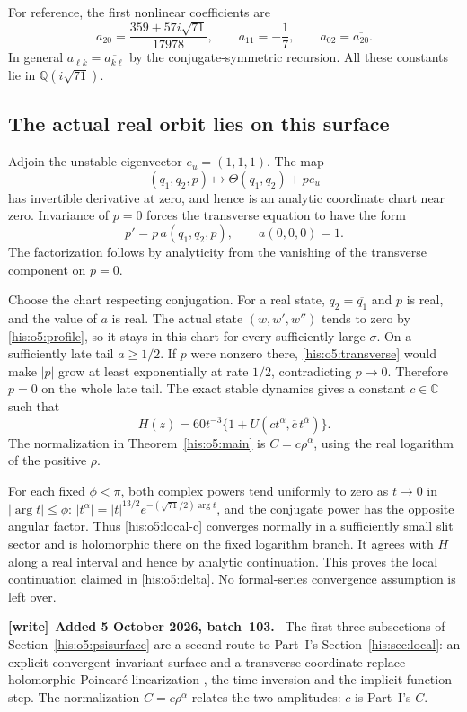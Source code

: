 \documentclass[11pt]{article}
\theoremstyle{remark}\newtheorem{remark}[theorem]{Remark}
\newcommand{\C}{\mathbb C}
\numberwithin{equation}{section}
\newenvironment{writenote}[1][]{\par\smallskip\begingroup\small
 \noindent\textbf{[write]}\if\relax\detokenize{#1}\relax\else~\textbf{#1.}\fi\ }%
 {\par\endgroup\smallskip}
\begin{document}
For reference, the first nonlinear coefficients are
\begin{equation}\label{his:o5:a2}
a_{20}=\frac{359+57i\sqrt{71}}{17978},\qquad
a_{11}=-\frac17,\qquad a_{02}=\overline{a_{20}}.
\end{equation}
In general $a_{\ell k}=\overline{a_{k\ell}}$ by the conjugate-symmetric
recursion. All these constants lie in $\mathbb Q(i\sqrt{71})$.

\subsection{The actual real orbit lies on this surface}
Adjoin the unstable eigenvector $e_u=(1,1,1)$. The map
\[
(q_1,q_2,p)\longmapsto\Theta(q_1,q_2)+pe_u
\]
has invertible derivative at zero, and hence is an analytic coordinate
chart near zero. Invariance of $p=0$ forces the transverse equation to have
the form
\begin{equation}\label{his:o5:transverse}
p'=p\,a(q_1,q_2,p),\qquad a(0,0,0)=1.
\end{equation}
The factorization follows by analyticity from the vanishing of the
transverse component on $p=0$.

Choose the chart respecting conjugation. For a real state,
$q_2=\overline{q_1}$ and $p$ is real, and the value of $a$ is real.
The actual state $(w,w',w'')$ tends to zero by \eqref{his:o5:profile}, so it stays
in this chart for every sufficiently large $\sigma$. On a sufficiently
late tail $a\ge1/2$. If $p$ were nonzero there, \eqref{his:o5:transverse} would
make $|p|$ grow at least exponentially at rate $1/2$, contradicting
$p\to0$. Therefore $p=0$ on the whole late tail.
The exact stable dynamics gives a constant $c\in\C$ such that
\begin{equation}\label{his:o5:local-c}
H(z)=60t^{-3}\{1+U(ct^\alpha,\overline c\,t^{\overline\alpha})\}.
\end{equation}
The normalization in Theorem~\ref{his:o5:main} is $C=c\rho^\alpha$, using the
real logarithm of the positive $\rho$.

For each fixed $\phi<\pi$, both complex powers tend uniformly to zero as
$t\to0$ in $|\arg t|\le\phi$:
$|t^\alpha|=|t|^{13/2}e^{-(\sqrt{71}/2)\arg t}$, and the conjugate power
has the opposite angular factor. Thus \eqref{his:o5:local-c} converges normally
in a sufficiently small slit sector and is holomorphic there on the fixed
logarithm branch. It agrees with $H$ along a real interval and hence by
analytic continuation. This proves the local continuation claimed in
\eqref{his:o5:delta}. No formal-series convergence assumption is left over.
\begin{writenote}[Added 5 October 2026, batch~103]
The first three subsections of Section~\ref{his:o5:psisurface} are a second route to Part~I's Section~\ref{his:sec:local}: an explicit convergent invariant surface and a transverse coordinate replace holomorphic Poincar\'e linearization \cite{iy2008}, the time inversion and the implicit-function step. The normalization $C=c\rho^\alpha$ relates the two amplitudes: $c$ is Part~I's $C$.
\end{writenote}
\end{document}
